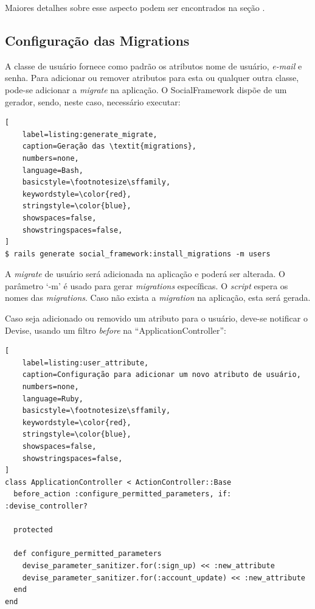 Maiores detalhes sobre esse aspecto podem ser encontrados na seção .

\subsection{Configuração das Migrations}
\label{configuracao_das_migrations}

A classe de usuário fornece como padrão os atributos nome de usuário, \textit{e-mail} e senha. Para adicionar ou remover atributos para esta ou qualquer outra classe, pode-se adicionar a \textit{migrate} na aplicação. O SocialFramework dispõe de um gerador, sendo, neste caso, necessário executar:

\begin{lstlisting}[
    label=listing:generate_migrate,
    caption=Geração das \textit{migrations},
    numbers=none,
    language=Bash,
    basicstyle=\footnotesize\sffamily,
    keywordstyle=\color{red},
    stringstyle=\color{blue},
    showspaces=false,
    showstringspaces=false,
]
$ rails generate social_framework:install_migrations -m users
\end{lstlisting}

A \textit{migrate} de usuário será adicionada na aplicação e poderá ser alterada. O parâmetro `-m' é usado para gerar \textit{migrations} específicas. O \textit{script} espera os nomes das \textit{migrations}. Caso não exista a \textit{migration} na aplicação, esta será gerada.

Caso seja adicionado ou removido um atributo para o usuário, deve-se notificar o Devise, usando um filtro \textit{before} na ``ApplicationController'':

\begin{lstlisting}[
    label=listing:user_attribute,
    caption=Configuração para adicionar um novo atributo de usuário,
    numbers=none,
    language=Ruby,
    basicstyle=\footnotesize\sffamily,
    keywordstyle=\color{red},
    stringstyle=\color{blue},
    showspaces=false,
    showstringspaces=false,
]
class ApplicationController < ActionController::Base
  before_action :configure_permitted_parameters, if: :devise_controller?

  protected

  def configure_permitted_parameters
    devise_parameter_sanitizer.for(:sign_up) << :new_attribute
    devise_parameter_sanitizer.for(:account_update) << :new_attribute
  end
end
\end{lstlisting}

